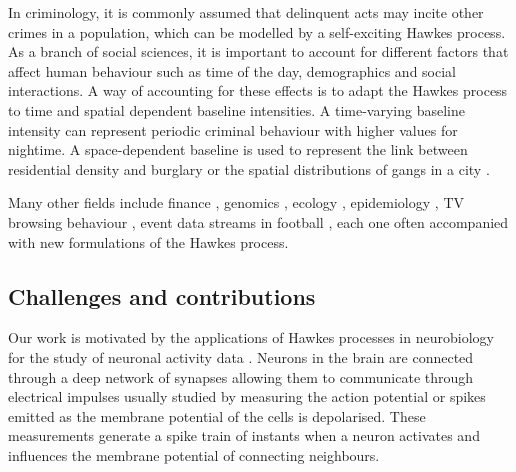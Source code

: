     In criminology, it is commonly assumed that delinquent acts may incite other crimes in a population, which can be modelled by a self-exciting Hawkes process.
    As a branch of social sciences, it is important to account for different factors that affect human behaviour such as time of the day, demographics and social interactions.
    A way of accounting for these effects is to adapt the Hawkes process to time and spatial dependent baseline intensities. 
    A time-varying baseline intensity can represent periodic criminal behaviour \parencite{Lewis2011} with higher values for nightime.
    A space-dependent baseline is used to represent the link between residential density and burglary \parencite{Mohler2011} or the spatial distributions of gangs in a city \parencite{Linderman2014}.


    Many other fields include finance \parencite{Embrechts2011, Bacry2013, Roueff2019, Lotz2024}, genomics \parencite{Reynaud2010, Carstensen2010}, ecology \parencite{Denis2024, Nicvert2024}, epidemiology \parencite{Rizoiu2018, Chiang2022}, TV browsing behaviour \parencite{Xu2016}, event data streams in football \parencite{Baouan2023, Narayanan2023}, 
    each one often accompanied with new formulations of the Hawkes process.

    \subsection{Challenges and contributions}

    Our work is motivated by the applications of Hawkes processes in neurobiology for the study of neuronal activity data \parencite{Reynaud2013, Lambert2018, Duval2021}.
    Neurons in the brain are connected through a deep network of synapses allowing them to communicate through electrical impulses usually studied by measuring the action potential or spikes emitted as the membrane potential of the cells is depolarised.
    These measurements generate a spike train of instants when a neuron activates and influences the membrane potential of connecting neighbours.

